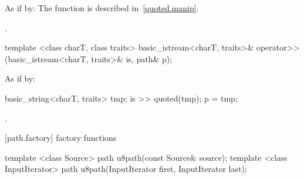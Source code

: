 \begin{itemdescr}
\pnum
\effects As if by: 
\enternote The  function is described in~\ref{quoted.manip}. \exitnote

\pnum
\returns {}.
\end{itemdescr}

\begin{itemdecl}
template <class charT, class traits>
  basic_istream<charT, traits>&
    operator>>(basic_istream<charT, traits>& is, path& p);
\end{itemdecl}

\begin{itemdescr}
\pnum
\effects
As if by:
\begin{codeblock}
basic_string<charT, traits> tmp;
is >> quoted(tmp);
p = tmp;
\end{codeblock}

\pnum
\returns {}.
\end{itemdescr}

[path.factory]{ factory functions}

\begin{itemdecl}
template <class Source>
  path u8path(const Source& source);
template <class InputIterator>
  path u8path(InputIterator first, InputIterator last);
\end{itemdecl}

